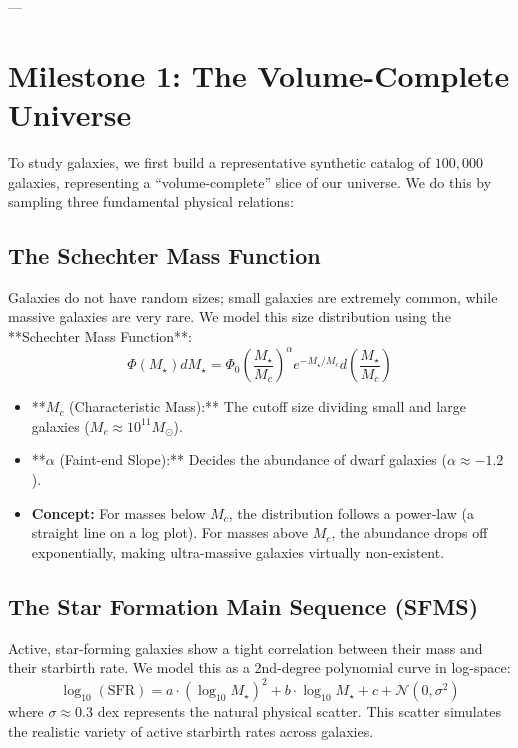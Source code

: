 \documentclass[11pt,a4paper]{article}
\begin{document}
---

\section{Milestone 1: The Volume-Complete Universe}
To study galaxies, we first build a representative synthetic catalog of $100,000$ galaxies, representing a ``volume-complete'' slice of our universe. We do this by sampling three fundamental physical relations:

\subsection{The Schechter Mass Function}
Galaxies do not have random sizes; small galaxies are extremely common, while massive galaxies are very rare. We model this size distribution using the **Schechter Mass Function**:
$$\Phi(M_\star) dM_\star = \Phi_0 \left(\frac{M_\star}{M_c}\right)^\alpha e^{-M_\star / M_c} d\left(\frac{M_\star}{M_c}\right)$$
\begin{itemize}
    \item **$M_c$ (Characteristic Mass):** The cutoff size dividing small and large galaxies ($M_c \approx 10^{11} M_\odot$).
    \item **$\alpha$ (Faint-end Slope):** Decides the abundance of dwarf galaxies ($\alpha \approx -1.2$).
    \item \textbf{Concept:} For masses below $M_c$, the distribution follows a power-law (a straight line on a log plot). For masses above $M_c$, the abundance drops off exponentially, making ultra-massive galaxies virtually non-existent.
\end{itemize}

\subsection{The Star Formation Main Sequence (SFMS)}
Active, star-forming galaxies show a tight correlation between their mass and their starbirth rate. We model this as a 2nd-degree polynomial curve in log-space:
$$\log_{10}(\text{SFR}) = a \cdot (\log_{10} M_\star)^2 + b \cdot \log_{10} M_\star + c + \mathcal{N}(0, \sigma^2)$$
where $\sigma \approx 0.3$ dex represents the natural physical scatter. This scatter simulates the realistic variety of active starbirth rates across galaxies.
\end{document}
